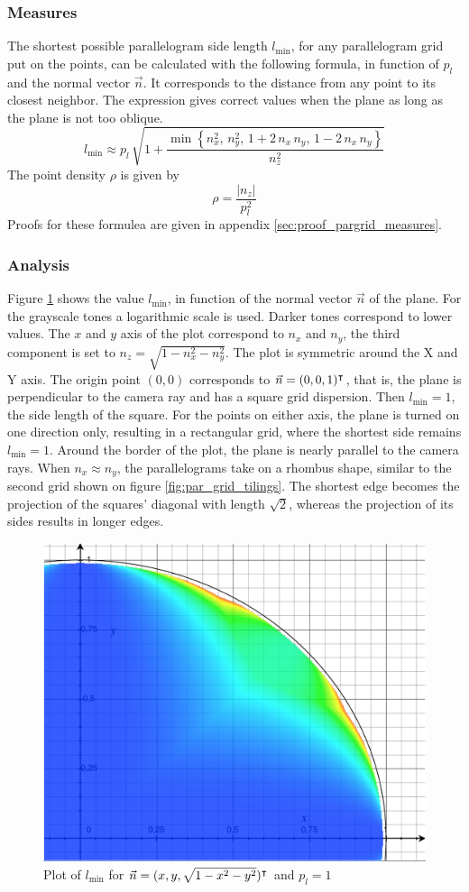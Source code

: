 \subsubsection{Measures}
The shortest possible parallelogram side length $l_{\text{min}}$, for any parallelogram grid put on the points, can be calculated with the following formula, in function of $p_l$ and the normal vector $\vec{n}$. It corresponds to the distance from any point to its closest neighbor. The expression gives correct values when the plane as long as the plane is not too oblique.
\begin{equation} \label{eq:pargrid_lmin}
l_{\text{min}} \approx p_l \, \sqrt{1 + \frac{\min \left\{
	n^2_x, \,
	n^2_y, \,
	1 + 2 \, n_x \, n_y, \,
	1 - 2 \, n_x \, n_y
\right\} }{n^2_z}}
\end{equation}
The point density $\rho$ is given by
\begin{equation}
\rho = \frac{| n_z |}{p^2_l}
\end{equation}
Proofs for these formulea are given in appendix \ref{sec:proof_pargrid_measures}.


\subsubsection{Analysis}
Figure \ref{fig:lmin_plot} shows the value $l_{\text{min}}$, in function of the normal vector $\vec{n}$ of the plane. For the grayscale tones a logarithmic scale is used. Darker tones correspond to lower values. The $x$ and $y$ axis of the plot correspond to $n_x$ and $n_y$, the third component is set to $n_z = \sqrt{1 - n^2_x - n^2_y}$. The plot is symmetric around the X and Y axis. The origin point $(0, 0)$ corresponds to $\vec{n} = (0, 0, 1)^\intercal$, that is, the plane is perpendicular to the camera ray and has a square grid dispersion. Then $l_{\text{min}} = 1$, the side length of the square. For the points on either axis, the plane is turned on one direction only, resulting in a rectangular grid, where the shortest side remains $l_{\text{min}} = 1$. Around the border of the plot, the plane is nearly parallel to the camera rays. When $n_x \approx n_y$, the parallelograms take on a rhombus shape, similar to the second grid shown on figure \ref{fig:par_grid_tilings}. The shortest edge becomes the projection of the squares' diagonal with length $\sqrt{2}$, whereas the projection of its sides results in longer edges.

\begin{figure}[p]
\centering
\includegraphics[width=.4\textwidth]{fig/lmin_plot.pdf}
\caption{Plot of $l_{\text{min}}$ for $\vec{n} = (x, y, \sqrt{1 - x^2 - y^2})^\intercal$ and $p_l = 1$}
\label{fig:lmin_plot}
\end{figure}


